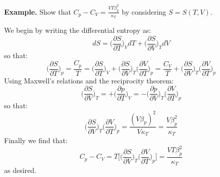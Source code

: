 \documentclass[a4paper,11pt,oneside]{book}
\begin{document}
\begin{strategy}
\textbf{Example.} Show that $C_p- C_V = \frac{VT\beta_p^2}{\kappa_T}$ by considering $S=S(T,V)$. 
\end{strategy}
\begin{mdframed}
\begin{solution}
We begin by writing the differential entropy as:
\begin{equation}
dS = \bigg(\frac{\partial S}{\partial T}\bigg)_V dT + \bigg(\frac{\partial S}{\partial V}\bigg)_T dV
\end{equation}
so that:
\begin{equation}
    \bigg(\frac{\partial S}{\partial T}\bigg)_p=\frac{C_p}{T} = \bigg(\frac{\partial S}{\partial T}\bigg)_V + \bigg(\frac{\partial S}{\partial V}\bigg)_T \bigg(\frac{\partial V}{\partial T}\bigg)_p = \frac{C_V}{T} + \bigg(\frac{\partial S}{\partial V}\bigg)_T \bigg(\frac{\partial V}{\partial T}\bigg)_p 
\end{equation}
Using Maxwell's relations and the reciprocity theorem:
\begin{equation}
    \bigg(\frac{\partial S}{\partial V}\bigg)_T = + \bigg(\frac{\partial p}{\partial T}\bigg)_V = -\bigg(\frac{\partial p}{\partial V}\bigg)_T\bigg(\frac{\partial V}{\partial T}\bigg)_p 
\end{equation}
so that:
\begin{equation}
  \bigg(\frac{\partial S}{\partial V}\bigg)_T \bigg(\frac{\partial V}{\partial T}\bigg)_p   = \frac{(V \beta_p)^2}{V\kappa_T} = \frac{V \beta_p^2}{\kappa_T}
\end{equation}
Finally we find that:
\begin{equation}
    C_p - C_V = T\Bigg[\bigg(\frac{\partial S}{\partial V}\bigg)_T \bigg(\frac{\partial V}{\partial T}\bigg)_p\Bigg] = \frac{VT \beta_p^2}{\kappa_T}
\end{equation}
as desired. 
\end{solution}
\end{mdframed}
\end{document}
